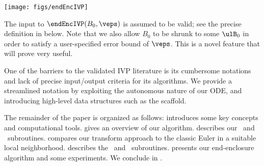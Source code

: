 			\texttt{[image: figs/endEncIVP]}
		\eeql


	
    The input to $\endEncIVP(B_0,\veps)$ is assumed to be
	valid;  see the precise definition in
	below.  Note that we also allow $B_0$ to be shrunk to some
	$\ulB_0$ in order to satisfy a user-specified
	error bound of $\veps$.  This is a novel feature that
	will prove very useful.
    





	
One of the barriers to the validated IVP literature
	is its cumbersome notations and lack of precise
	input/output criteria for its algorithms.
	We provide a streamlined notation by exploiting
	the autonomous nature of our ODE, and introducing
	high-level data structures such as the scaffold.

	The remainder of the paper is organized as follows: 
	 introduces some key concepts and computational tools. 
	 gives an overview of our algorithm.
	 describes our \stepA\ and \stepB\ subroutines.
	 compares our transform approach to
		the classic Euler in a suitable local neighborhood.
	 describes the \Extend\ and \Refine\ subroutines.
	 presents our end-enclosure algorithm and some experiments.
	We conclude in .
	

